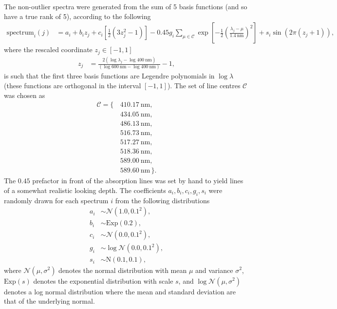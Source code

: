 \documentclass[onecolumn,floatfix,linenumbers,trackchanges]{aastex631}
\begin{document}
The non-outlier spectra were generated from the sum of 5 basis functions (and so have a true rank of 5), according to the following
\begin{align}
    \mathrm{spectrum}_{i}(j) &= a_i + b_i z_j + c_i \left[\frac{1}{2} \left( 3 z_j^2 - 1 \right)\right] - 0.45 g_i \sum_{\mu \in \mathcal{C}} \exp{\left[ - \frac{1}{2} \left( \frac{\lambda_j - \mu}{1.4~\mathrm{nm}} \right)^2  \right]} + s_i \sin{\left( 2 \pi \left( z_j + 1 \right)  \right)},
\end{align}
where the rescaled coordinate $z_j\in[-1, 1]$
\begin{align}
    z_j &= \frac{2 \left( \log{\lambda_j} - \log{400~\mathrm{nm}} \right)}{\left( \log{600~\mathrm{nm}} - \log{400~\mathrm{nm}} \right)} - 1,
\end{align}
is such that the first three basis functions are Legendre polynomials in $\log{\lambda}$ (these functions are orthogonal in the interval $[-1, 1]$).
The set of line centres $\mathcal{C}$ was chosen as
\begin{align} 
    \mathcal{C} = \{\,
        & 410.17~\mathrm{nm}, \\
        & 434.05~\mathrm{nm}, \\
        & 486.13~\mathrm{nm}, \\
        & 516.73~\mathrm{nm}, \\
        & 517.27~\mathrm{nm}, \\ 
        & 518.36~\mathrm{nm}, \\
        & 589.00~\mathrm{nm}, \\
        & 589.60~\mathrm{nm} \,\}.
\end{align}
The $0.45$ prefactor in front of the absorption lines was set by hand to yield lines of a somewhat realistic looking depth.
The coefficients $a_i, b_i, c_i, g_i, s_i$ were randomly drawn for each spectrum $i$ from the following distributions
\begin{align}
    a_i &\sim \mathcal{N} \left( 1.0, 0.1^2 \right), \\
    b_i &\sim \mathrm{Exp} \left( 0.2 \right), \\
    c_i &\sim \mathcal{N} \left( 0.0, 0.1^2 \right), \\
    g_i &\sim \log{\mathcal{N}} \left( 0.0, 0.1^2 \right), \\
    s_i &\sim \mathrm{N} \left( 0.1, 0.1 \right),
\end{align}
where $\mathcal{N}(\mu, \sigma^2)$ denotes the normal distribution with mean $\mu$ and variance $\sigma^2$, $\mathrm{Exp}(s)$ denotes the exponential distribution with scale $s$, and $\log{\mathcal{N}}(\mu, \sigma^2)$ denotes a log normal distribution where the mean and standard deviation are that of the underlying normal.
\end{document}
